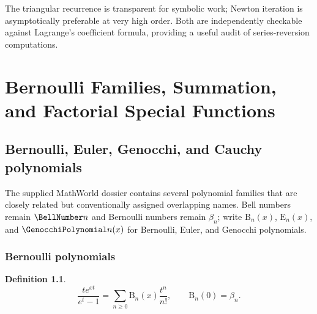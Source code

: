 \documentclass[11pt,a4paper,oneside,openany]{book}
\theoremstyle{definition}
\newtheorem{definition}[theorem]{Definition}
\theoremstyle{remark}
\newcommand{\BerP}[2]{\mathrm B_{#1}(#2)}
\newcommand{\EulP}[2]{\mathrm E_{#1}(#2)}
\begin{document}
The triangular recurrence is transparent for symbolic work; Newton iteration
is asymptotically preferable at very high order. Both are independently
checkable against Lagrange's coefficient formula, providing a useful audit of
series-reversion computations.

\part{Bernoulli Families, Summation, and Factorial Special Functions}

\chapter{Bernoulli, Euler, Genocchi, and Cauchy polynomials}

The supplied MathWorld dossier contains several polynomial families that are
closely related but conventionally assigned overlapping names. Bell numbers
remain $\BellNumber n$ and Bernoulli numbers remain $\beta_n$; write
$\BerP n x$, $\EulP n x$, and $\GenocchiPolynomial n(x)$ for Bernoulli, Euler, and Genocchi
polynomials.

\section{Bernoulli polynomials}

\begin{definition}
\begin{equation}\label{unif:eq-bernoulli-polynomial-egf}
 \frac{te^{xt}}{e^t-1}=\sum_{n\ge0}\BerP n x\frac{t^n}{n!},
 \qquad \BerP n0=\beta_n.
\end{equation}
\end{definition}
\end{document}
